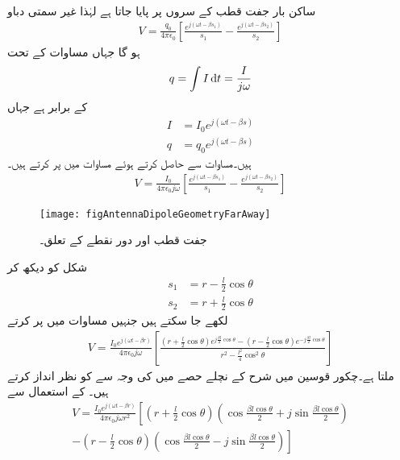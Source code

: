ساکن بار جفت قطب کے سروں پر پایا جاتا ہے لہٰذا غیر سمتی دباو
\begin{align}\label{مساوات_اینٹینا_غیر_سمتی_دباو_الف}
V=\frac{q_0}{4\pi \epsilon_0} \left[\frac{e^{j(\omega t -\beta s_1)}}{s_1} -\frac{e^{j(\omega t -\beta s_2)}}{s_2}\right]
\end{align}
ہو گا جہاں مساوات  کے تحت
\begin{align}\label{مساوات_اینٹینا_رو_اور_بار_ب}
q=\int I \dif t=\frac{I}{j\omega }
\end{align}
کے برابر ہے جہاں
\begin{align*}
I&=I_0 e^{j(\omega t -\beta s)}\\
q&=q_0  e^{j(\omega t -\beta s)}
\end{align*}
ہیں۔مساوات  سے  حاصل کرتے ہوئے مساوات  میں پر کرتے ہیں۔ 
\begin{align}\label{مساوات_اینٹینا_غیر_سمتی_دباو_ب}
V=\frac{I_0}{4\pi \epsilon_0 j \omega } \left[\frac{e^{j(\omega t -\beta s_1)}}{s_1} -\frac{e^{j(\omega t -\beta s_2)}}{s_2}\right]
\end{align}
%
\begin{figure}
\centering
\texttt{[image: figAntennaDipoleGeometryFarAway]}
\caption{جفت قطب اور دور نقطے کے تعلق۔}
\label{شکل_اینٹینا_جفت_قطب_تعلق}
\end{figure}
شکل  کو دیکھ کر
\begin{align*}
s_1&=r-\frac{l}{2}\cos \theta\\
s_2&=r+\frac{l}{2}\cos \theta
\end{align*}
لکھے جا سکتے ہیں جنہیں مساوات  میں پر کرتے
\begin{align}
V=\frac{I_0 e^{j(\omega t -\beta r)}}{4\pi \epsilon_0 j \omega}\left[\frac{(r+\frac{l}{2}\cos \theta) e^{j\frac{\beta l}{2}\cos \theta}-(r-\frac{l}{2}\cos \theta) e^{-j\frac{\beta l}{2}\cos \theta}}{r^2-\frac{l^2}{4}\cos^2 \theta} \right]
\end{align}
ملتا ہے۔چکور قوسین میں شرح کے نچلے حصے میں  کی وجہ سے   کو نظر انداز کرتے ہیں۔ کے استعمال سے
\begin{multline}\label{مساوات_اینٹینا_غیر_سمتی_دباو_پ}
V=\frac{I_0 e^{j(\omega t -\beta r)}}{4\pi \epsilon_0 j \omega r^2} \left[\left(r+\frac{l}{2}\cos \theta\right) \left(\cos \frac{\beta l \cos \theta}{2} +j \sin \frac{\beta l \cos \theta}{2}\right)\right.\\
-\left.\left(r-\frac{l}{2}\cos \theta\right) \left(\cos \frac{\beta l \cos \theta}{2} -j \sin \frac{\beta l \cos \theta}{2}\right) \right]
\end{multline}  
